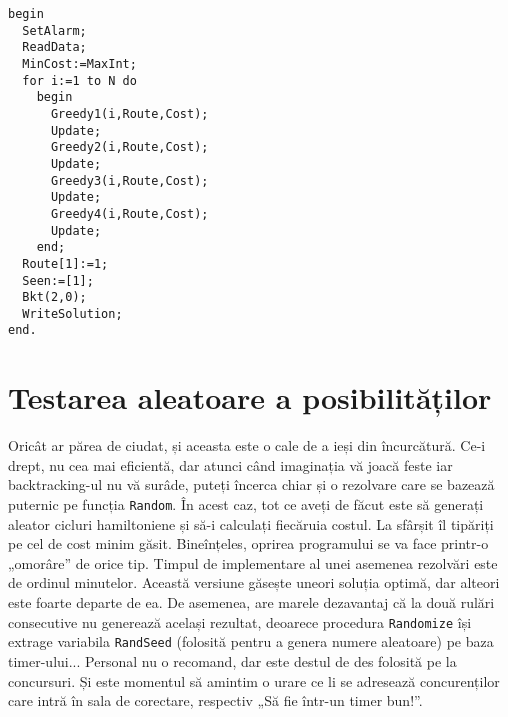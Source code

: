 \begin{verbatim}
begin
  SetAlarm;
  ReadData;
  MinCost:=MaxInt;
  for i:=1 to N do
    begin
      Greedy1(i,Route,Cost);
      Update;
      Greedy2(i,Route,Cost);
      Update;
      Greedy3(i,Route,Cost);
      Update;
      Greedy4(i,Route,Cost);
      Update;
    end;
  Route[1]:=1;
  Seen:=[1];
  Bkt(2,0);
  WriteSolution;
end.
\end{verbatim}

\section{Testarea aleatoare a posibilităților}

Oricât ar părea de ciudat, și aceasta este o cale de a ieși din
încurcătură. Ce-i drept, nu cea mai eficientă, dar atunci când imaginația vă
joacă feste iar backtracking-ul nu vă surâde, puteți încerca chiar și o
rezolvare care se bazează puternic pe funcția {\tt Random}. În acest caz, tot
ce aveți de făcut este să generați aleator cicluri hamiltoniene și să-i
calculați fiecăruia costul. La sfârșit îl tipăriți pe cel de cost minim
găsit. Bineînțeles, oprirea programului se va face printr-o „omorâre” de orice
tip. Timpul de implementare al unei asemenea rezolvări este de ordinul
minutelor. Această versiune găsește uneori soluția optimă, dar alteori este
foarte departe de ea. De asemenea, are marele dezavantaj că la două rulări
consecutive nu generează același rezultat, deoarece procedura {\tt Randomize}
își extrage variabila {\tt RandSeed} (folosită pentru a genera numere
aleatoare) pe baza timer-ului... Personal nu o recomand, dar este destul de
des folosită pe la concursuri. Și este momentul să amintim o urare ce li se
adresează concurenților care intră în sala de corectare, respectiv „Să fie
într-un timer bun!”.

\inputminted{pascal}{src/chapter5-5.pas}
